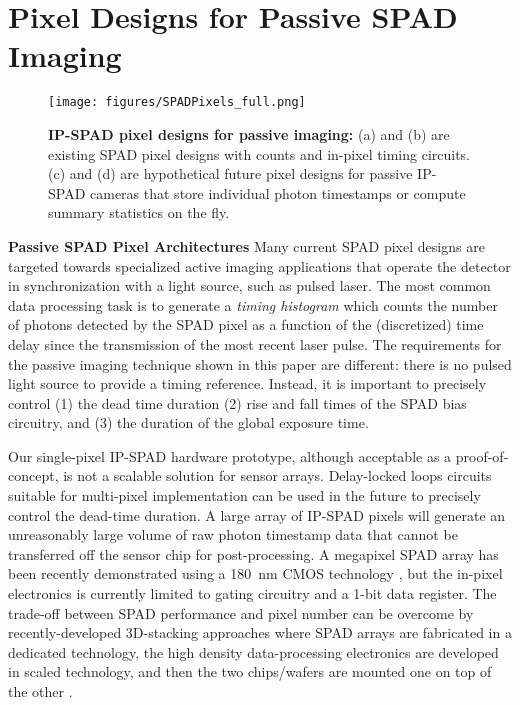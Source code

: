 \section{Pixel Designs for Passive SPAD Imaging\label{suppl:pixel_designs}}

\begin{figure}[!htb]
  \centering \texttt{[image: figures/SPADPixels\_full.png]}
  \caption{\textbf{IP-SPAD pixel designs for passive imaging:} (a) and (b) are
  existing SPAD pixel designs with counts and in-pixel timing circuits. (c) and
  (d) are hypothetical future pixel designs for passive IP-SPAD cameras that
  store individual photon timestamps or compute summary statistics on the fly.
  \label{fig:array_designs_full}}
\end{figure}


\smallskip
\noindent\textbf{Passive SPAD Pixel Architectures}
Many current SPAD pixel designs are targeted towards specialized active imaging
applications that operate the detector in synchronization with a light source,
such as pulsed laser. The most common data processing task is to generate a
\emph{timing histogram} which counts the number of photons detected by the SPAD
pixel as a function of the (discretized) time delay since the transmission of
the most recent laser pulse. The requirements for the passive imaging technique
shown in this paper are different: there is no pulsed light source to provide
a timing reference. Instead, it is important to precisely control (1) the dead
time duration (2) rise and fall times of the SPAD bias circuitry, and
(3) the duration of the global exposure time.

Our single-pixel IP-SPAD hardware prototype, although acceptable as a
proof-of-concept, is not a scalable solution for sensor arrays.
Delay-locked loops circuits suitable for multi-pixel implementation
can be used in the future to precisely control the dead-time duration.  A large
array of IP-SPAD pixels will generate an unreasonably large volume of raw
photon timestamp data that cannot be transferred off the sensor chip for
post-processing. A megapixel SPAD array has been recently demonstrated using a
\SI{180}{\nm} CMOS technology \cite{Morimoto_2020}, but the in-pixel
electronics is currently limited to gating circuitry and a 1-bit data register.
The trade-off between SPAD performance and pixel number can be overcome by
recently-developed 3D-stacking approaches where  SPAD arrays are fabricated in
a dedicated technology, the high density data-processing electronics are
developed in scaled technology, and then the two chips/wafers are mounted one
on top of the other \cite{Henderson_2019_ISSCC,Charbon_2018}.

